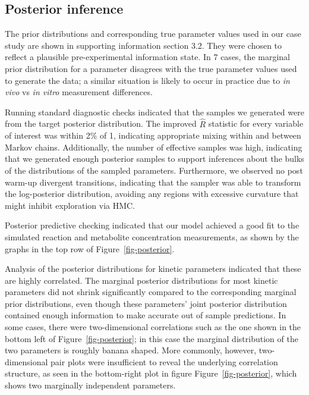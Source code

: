 \documentclass[journal=asbcd6,manuscript=article,layout=traditional]{achemso}
\begin{document}
\hypertarget{posterior-inference}{%
\subsection{Posterior inference}\label{posterior-inference}}

The prior distributions and corresponding true parameter values used in
our case study are shown in supporting information section 3.2. They
were chosen to reflect a plausible pre-experimental information state.
In 7 cases, the marginal prior distribution for a parameter disagrees
with the true parameter values used to generate the data; a similar
situation is likely to occur in practice due to \emph{in vivo} vs
\emph{in vitro} measurement differences.

Running standard diagnostic checks indicated that the samples we
generated were from the target posterior distribution. The improved
\(\hat{R}\) statistic
\citep{vehtariRankNormalizationFoldingLocalization2021} for every
variable of interest was within 2\% of 1, indicating appropriate mixing
within and between Markov chains. Additionally, the number of effective
samples was high, indicating that we generated enough posterior samples
to support inferences about the bulks of the distributions of the
sampled parameters. Furthermore, we observed no post warm-up divergent
transitions, indicating that the sampler was able to transform the
log-posterior distribution, avoiding any regions with excessive
curvature that might inhibit exploration via HMC.

Posterior predictive checking indicated that our model achieved a good
fit to the simulated reaction and metabolite concentration measurements,
as shown by the graphs in the top row of Figure~\ref{fig-posterior}.

Analysis of the posterior distributions for kinetic parameters indicated
that these are highly correlated. The marginal posterior distributions
for most kinetic parameters did not shrink significantly compared to the
corresponding marginal prior distributions, even though these
parameters' joint posterior distribution contained enough information to
make accurate out of sample predictions. In some cases, there were
two-dimensional correlations such as the one shown in the bottom left of
Figure~\ref{fig-posterior}; in this case the marginal distribution of
the two parameters is roughly banana shaped. More commonly, however,
two-dimensional pair plots were insufficient to reveal the underlying
correlation structure, as seen in the bottom-right plot in figure
Figure~\ref{fig-posterior}, which shows two marginally independent
parameters.
\end{document}
